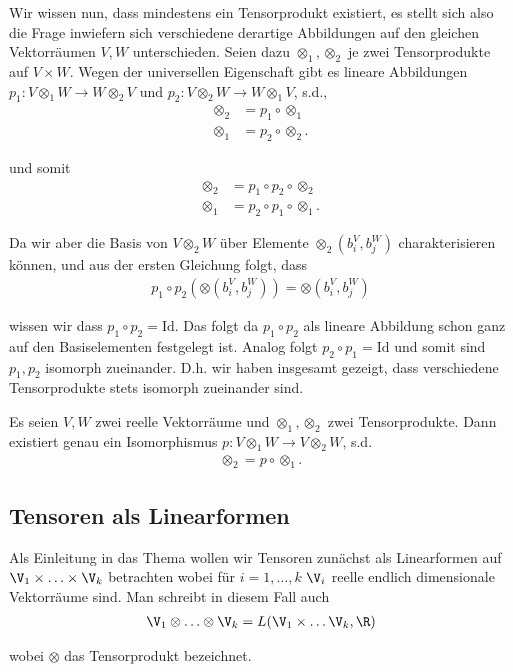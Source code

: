 \par
Wir wissen nun, dass mindestens ein Tensorprodukt existiert, es stellt sich also die Frage inwiefern sich verschiedene derartige Abbildungen auf den gleichen Vektorräumen \(V,W\) unterschieden. Seien dazu \(\otimes_1, \otimes_2\) je zwei Tensorprodukte auf \(V\times W\). Wegen der universellen Eigenschaft gibt es lineare Abbildungen \(p_1: V\otimes_1 W\to W\otimes_2 V\) und \(p_2: V\otimes_2 W\to W\otimes_1 V\), s.d.,
\begin{align*}
\otimes_2 &= p_1 \circ \otimes_1\\
\otimes_1 &= p_2 \circ \otimes_2.
\end{align*}
\par
und somit
\begin{align*}
\otimes_2 &= p_1\circ p_2 \circ \otimes_2\\
\otimes_1 &= p_2\circ p_1 \circ \otimes_1.
\end{align*}
\par
Da wir aber die Basis von \(V\otimes_2 W\) über Elemente \(\otimes_2(b_i^V, b_j^W)\) charakterisieren können, und aus der ersten Gleichung folgt, dass
\begin{align*}
p_1\circ p_2(\otimes(b_i^V,b_j^W)) = \otimes(b_i^V, b_j^W)
\end{align*}
\par
wissen wir dass \(p_1\circ p_2 = \mathrm{Id}\). Das folgt da \(p_1\circ p_2\) als lineare Abbildung schon ganz auf den Basiselementen festgelegt ist.
Analog folgt \(p_2\circ p_1 = \mathrm{Id}\) und somit sind \(p_1, p_2\) isomorph zueinander. D.h. wir haben insgesamt gezeigt, dass verschiedene Tensorprodukte stets isomorph zueinander sind.
\label{vektoranalysis/tensor:lemma-4}
\begin{lemma}{}{}



\par
Es seien \(V,W\) zwei reelle Vektorräume und \(\otimes_1,\otimes_2\) zwei Tensorprodukte. Dann existiert genau ein Isomorphismus \(p:V\otimes_1 W\to V\otimes_2 W\), s.d.
\begin{align*}
\otimes_2 = p\circ \otimes_1.
\end{align*}\end{lemma}


\subsection{Tensoren als Linearformen}
\label{\detokenize{vektoranalysis/tensor:tensoren-als-linearformen}}
\par
Als Einleitung in das Thema wollen wir Tensoren zunächst als Linearformen auf \(\V_1\times\ldots\times\V_k\)
betrachten wobei für \(i=1,\ldots,k\) \(\V_i\) reelle endlich dimensionale Vektorräume sind.
Man schreibt in diesem Fall auch
\begin{align*}
\V_1\otimes\ldots\otimes\V_k = L(\V_1\times\ldots\V_k,\R)
\end{align*}
\par
wobei \(\otimes\) das Tensorprodukt bezeichnet.

